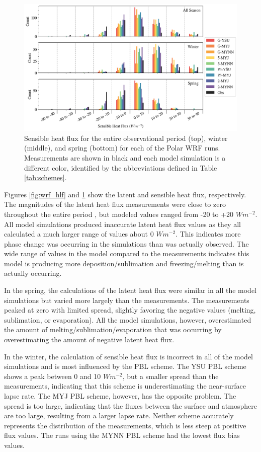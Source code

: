 \begin{figure}[h]
    \centering
    \includegraphics[width=1\linewidth]{figures/chapter3/WRF_SHF_Histo.png}
    \caption[Polar WRF simulated sensible heat flux histograms.]{Sensible heat flux for the entire observational period (top), winter (middle), and spring (bottom) for each of the Polar WRF runs. Measurements are shown in black and each model simulation is a different color, identified by the abbreviations defined in Table \ref{tab:schemes}.}
    \label{fig:wrf_shf}
\end{figure}

Figures \ref{fig:wrf_hlf} and \ref{fig:wrf_shf} show the latent and sensible heat flux, respectively. The magnitudes of the latent heat flux measurements were close to zero throughout the entire period \cite{walden:2017}, but modeled values ranged from -20 to +20 $Wm^{-2}$. All model simulations produced inaccurate latent heat flux values as they all calculated a much larger range of values about 0 $Wm^{-2}$. This indicates more phase change was occurring in the simulations than was actually observed. The wide range of values in the model compared to the measurements indicates this model is producing more deposition/sublimation and freezing/melting than is actually occurring. 

In the spring, the calculations of the latent heat flux were similar in all the model simulations but varied more largely than the measurements. The measurements peaked at zero with limited spread, slightly favoring the negative values (melting, sublimation, or evaporation). All the model simulations, however, overestimated the amount of melting/sublimation/evaporation that was occurring by overestimating the amount of negative latent heat flux. 

In the winter, the calculation of sensible heat flux is incorrect in all of the model simulations and is most influenced by the PBL scheme. The YSU PBL scheme shows a peak between 0 and 10 $Wm^{-2}$, but a smaller spread than the measurements, indicating that this scheme is underestimating the near-surface lapse rate. The MYJ PBL scheme, however, has the opposite problem. The spread is too large, indicating that the fluxes between the surface and atmosphere are too large, resulting from a larger lapse rate. Neither scheme accurately represents the distribution of the measurements, which is less steep at positive flux values. The runs using the MYNN PBL scheme had the lowest flux bias values.

